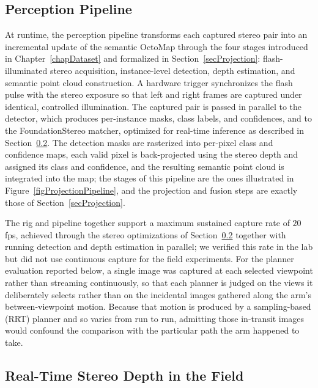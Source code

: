 \subsection{Perception Pipeline} \label{secPerceptionPipeline}

At runtime, the perception pipeline transforms each captured stereo pair
into an incremental update of the semantic OctoMap through the four stages
introduced in Chapter~\ref{chapDataset} and formalized in
Section~\ref{secProjection}: flash-illuminated stereo acquisition,
instance-level detection, depth estimation, and semantic point cloud
construction. A hardware trigger synchronizes the flash pulse with the
stereo exposure so that left and right frames are captured under identical,
controlled illumination. The captured pair is passed in parallel to the
detector, which produces per-instance masks, class labels, and confidences,
and to the FoundationStereo matcher, optimized for real-time inference as
described in Section~\ref{secStereoDepth}. The detection masks
are rasterized into per-pixel class and confidence maps, each valid pixel is
back-projected using the stereo depth and assigned its class and confidence,
and the resulting semantic point cloud is integrated into the map; the
stages of this pipeline are the ones illustrated in
Figure~\ref{figProjectionPipeline}, and the projection and fusion steps are
exactly those of Section~\ref{secProjection}.

The rig and pipeline together support a maximum sustained capture rate of
$20$\,fps, achieved through the stereo optimizations of
Section~\ref{secStereoDepth} together with running detection and depth
estimation in parallel; we verified this rate in the lab but did not use
continuous capture for the field experiments.
For the planner evaluation reported below, a single image was captured at
each selected viewpoint rather than streaming continuously, so that each
planner is judged on the views it deliberately selects rather than on the
incidental images gathered along the arm's between-viewpoint motion.
Because that motion is produced by a sampling-based (RRT) planner and so
varies from run to run, admitting those in-transit images would confound
the comparison with the particular path the arm happened to take.

\subsection{Real-Time Stereo Depth in the Field} \label{secStereoDepth}


